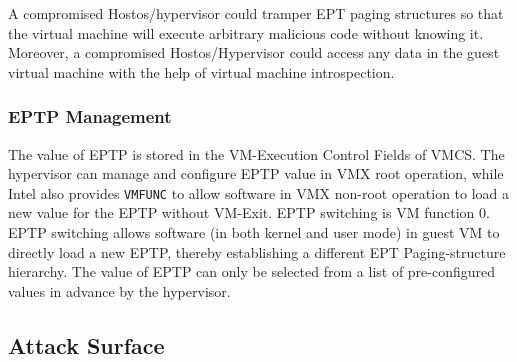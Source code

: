 A compromised Hostos/hypervisor could tramper EPT paging structures so that the virtual machine will execute arbitrary malicious code without knowing it. 
Moreover, a compromised Hostos/Hypervisor could access any data in the guest virtual machine with the help of virtual machine introspection.


\subsubsection{EPTP Management}%
\label{ssub:eptp_management}
The value of EPTP is stored in the VM-Execution Control Fields of VMCS. 
The hypervisor can manage and configure EPTP value in VMX root operation, while Intel also provides \verb|VMFUNC| to allow software in VMX non-root operation to load a new value for the EPTP without VM-Exit.
EPTP switching is VM function 0. EPTP switching allows software (in both kernel and user mode) in guest VM to directly load a new EPTP, thereby establishing a different EPT Paging-structure hierarchy. 
The value of EPTP can only be selected from a list of pre-configured values in advance by the hypervisor. 





\subsection{Attack Surface}\label{sub:attacksurface}

